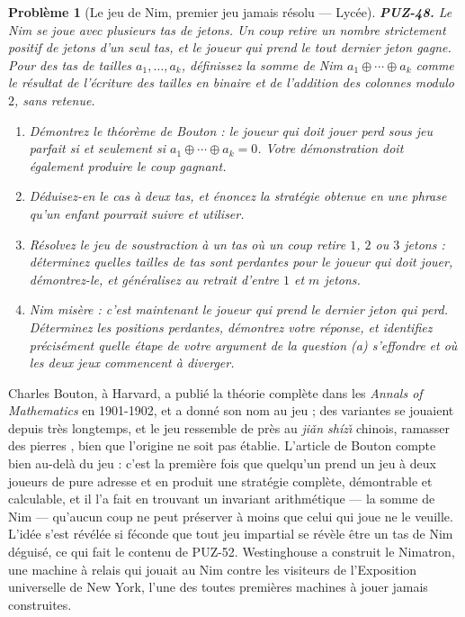 \documentclass[11pt]{article}
\newtheorem{problem}{Problème}
\begin{document}
\begin{problem}[{Le jeu de Nim, premier jeu jamais résolu --- Lycée}]
\textbf{PUZ-48.} Le Nim se joue avec plusieurs tas de jetons. Un coup retire un nombre
strictement positif de jetons d'un seul tas, et le joueur qui prend le tout dernier jeton
gagne. Pour des tas de tailles $ a_1, \dots, a_k $, définissez la \textit{somme de Nim}
$ a_1 \oplus \cdots \oplus a_k $ comme le résultat de l'écriture des tailles en binaire et
de l'addition des colonnes modulo $ 2 $, sans retenue.
\begin{enumerate}
\item[(a)] Démontrez le théorème de Bouton : le joueur qui doit jouer perd sous jeu parfait si et
seulement si $ a_1 \oplus \cdots \oplus a_k = 0 $. Votre démonstration doit également
produire le coup gagnant.
\item[(b)] Déduisez-en le cas à deux tas, et énoncez la stratégie obtenue en une phrase qu'un
enfant pourrait suivre et utiliser.
\item[(c)] Résolvez le jeu de soustraction à un tas où un coup retire $ 1 $, $ 2 $ ou $ 3 $
jetons : déterminez quelles tailles de tas sont perdantes pour le joueur qui doit jouer,
démontrez-le, et généralisez au retrait d'entre $ 1 $ et $ m $ jetons.
\item[(d)] Nim misère : c'est maintenant le joueur qui prend le dernier jeton qui \textit{perd}.
Déterminez les positions perdantes, démontrez votre réponse, et identifiez précisément
quelle étape de votre argument de la question (a) s'effondre et où les deux jeux commencent
à diverger.
\end{enumerate}

\end{problem}

\noindent Charles Bouton, à Harvard, a publié la théorie complète dans les
\textit{Annals of Mathematics} en 1901-1902, et a donné son nom au jeu ; des variantes se
jouaient depuis très longtemps, et le jeu ressemble de près au \textit{ji\v{a}n shíz\v{\i}} chinois,
\og{} ramasser des pierres \fg{}, bien que l'origine ne soit pas établie. L'article de Bouton
compte bien au-delà du jeu : c'est la première fois que quelqu'un prend un jeu à deux
joueurs de pure adresse et en produit une stratégie complète, démontrable et calculable, et
il l'a fait en trouvant un invariant arithmétique --- la somme de Nim --- qu'aucun coup ne peut
préserver à moins que celui qui joue ne le veuille. L'idée s'est révélée si féconde que tout
jeu impartial se révèle être un tas de Nim déguisé, ce qui fait le contenu de PUZ-52.
Westinghouse a construit le Nimatron, une machine à relais qui jouait au Nim contre les
visiteurs de l'Exposition universelle de New York, l'une des toutes premières machines à
jouer jamais construites.
\end{document}
